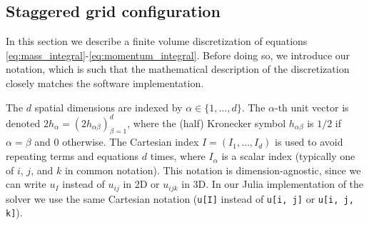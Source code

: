 \documentclass[preprint]{elsarticle}
\begin{document}
\subsection{Staggered grid configuration}

In this section we describe a finite volume discretization of equations
\eqref{eq:mass_integral}-\eqref{eq:momentum_integral}. Before doing so, we
introduce our notation, which is such that the mathematical description of the
discretization closely matches the software implementation.

The $d$ spatial dimensions are indexed by $\alpha \in \{1, \dots, d\}$.
The $\alpha$-th unit vector is denoted $2 h_\alpha = (2 h_{\alpha \beta})_{\beta
= 1}^d$, where the (half) Kronecker symbol $h_{\alpha \beta}$ is $1 / 2$ if
$\alpha = \beta$ and $0$ otherwise. The Cartesian index $I = (I_1, \dots,
I_d)$ is used to avoid repeating terms and equations $d$ times, where
$I_\alpha$ is a scalar index (typically one of $i$, $j$, and $k$ in common
notation). This notation is dimension-agnostic, since we can write $u_I$ instead
of $u_{i j}$ in 2D or $u_{i j k}$ in 3D. In our Julia implementation of the
solver we use the same Cartesian notation (\verb|u[I]| instead of \verb|u[i, j]|
or \verb|u[i, j, k]|).
\end{document}

